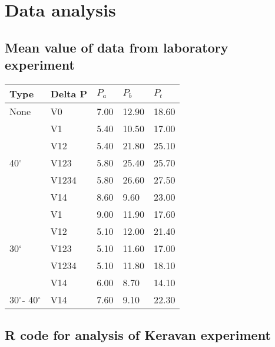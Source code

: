 
\chapter{Data analysis}\label{appx:first}

\section{Mean value of data from laboratory experiment}

\begin{table}[h!]
\centering
\begin{tabular}{ | l | l | l | l | l |  }
\hline
Type & Delta P  & $P_{a}$ & $P_{b}$ & $P_{t}$ \\
\hline
None & V0 & 7.00 & 12.90 & 18.60 \\ \hline
\multirow{5}{*}{40$^{\circ}$} & V1 & 5.40 & 10.50 & 17.00 \\
 & V12 & 5.40 & 21.80 & 25.10 \\
 & V123 & 5.80 & 25.40 & 25.70 \\
 & V1234 & 5.80 & 26.60 & 27.50 \\
 & V14 & 8.60 & 9.60 & 23.00\\ \hline
\multirow{5}{*}{30$^{\circ}$} & V1 & 9.00 & 11.90 & 17.60 \\
 & V12 & 5.10 & 12.00 & 21.40 \\
 & V123 & 5.10 & 11.60 & 17.00 \\
 & V1234 & 5.10 & 11.80 & 18.10 \\
 & V14 & 6.00 & 8.70 & 14.10\\ \hline
30$^{\circ}$- 40$^{\circ}$ & V14 & 7.60 & 9.10 & 22.30 \\ \hline
\end{tabular}
\end{table}

\section{R code for analysis of Keravan experiment}
\begin{code}
  \inputminted{r}{code/test.R}
  \label{code:rcode}
\end{code}

\clearpage %

